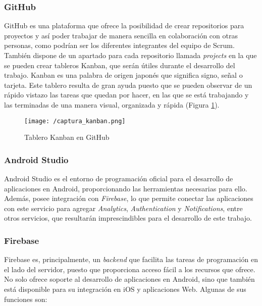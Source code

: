 \subsubsection*{GitHub}
GitHub es una plataforma que ofrece la posibilidad de crear repositorios para proyectos y así poder trabajar de manera sencilla en colaboración con otras personas, como podrían ser los diferentes integrantes del equipo de Scrum. También dispone de un apartado para cada repositorio llamada \textit{projects} en la que se pueden crear tableros Kanban, que serán útiles durante el desarrollo del trabajo. Kanban \cite{Gomez2017} es una palabra de origen japonés que significa signo, señal o tarjeta. Este tablero resulta de gran ayuda puesto que se pueden observar de un rápido vistazo las tareas que quedan por hacer, en las que se está trabajando y las terminadas de una manera visual, organizada y rápida (Figura \ref{fig:kanban}).

\begin{figure}[!h]
	\begin{center}
		\texttt{[image: /captura\_kanban.png]}
		\caption{Tablero Kanban en GitHub}
		\label{fig:kanban}
	\end{center}
\end{figure}

\subsubsection*{Android Studio}
Android Studio \cite{AndroidStudio} es el entorno de programación oficial para el desarrollo de aplicaciones en Android, proporcionando las herramientas necesarias para ello. Además, posee integración con \textit{Firebase}, lo que permite conectar las aplicaciones con este servicio para agregar \textit{Analytics}, \textit{Authentication} y \textit{Notifications}, entre otros servicios, que resultarán imprescindibles para el desarrollo de este trabajo.

\subsubsection*{Firebase}
Firebase \cite{GooFirebase} es, principalmente, un \textit{backend} que facilita las tareas de programación en el lado del servidor, puesto que proporciona acceso fácil a los recursos que ofrece. No solo ofrece soporte al desarrollo de aplicaciones en Android, sino que también está disponible para su integración en iOS y aplicaciones Web. Algunas de sus funciones son:


